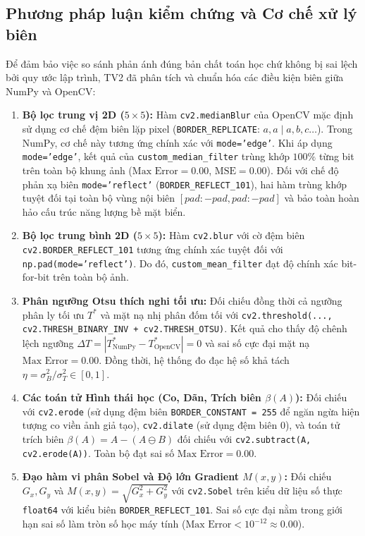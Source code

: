 \subsection{Phương pháp luận kiểm chứng và Cơ chế xử lý biên}
\label{subsec:verification_methodology}
Để đảm bảo việc so sánh phản ánh đúng bản chất toán học chứ không bị sai lệch bởi quy ước lập trình, TV2 đã phân tích và chuẩn hóa các điều kiện biên giữa NumPy và OpenCV:
\begin{enumerate}
    \item \textbf{Bộ lọc trung vị 2D ($5 \times 5$):} Hàm \texttt{cv2.medianBlur} của OpenCV mặc định sử dụng cơ chế đệm biên lặp pixel (\texttt{BORDER\_REPLICATE}: $a, a \mid a, b, c \dots$). Trong NumPy, cơ chế này tương ứng chính xác với \texttt{mode='edge'}. Khi áp dụng \texttt{mode='edge'}, kết quả của \texttt{custom\_median\_filter} trùng khớp $100\%$ từng bit trên toàn bộ khung ảnh ($\text{Max Error} = 0.00$, $\text{MSE} = 0.00$). Đối với chế độ phản xạ biên \texttt{mode='reflect'} (\texttt{BORDER\_REFLECT\_101}), hai hàm trùng khớp tuyệt đối tại toàn bộ vùng nội biên $[pad : -pad, pad : -pad]$ và bảo toàn hoàn hảo cấu trúc năng lượng bề mặt biển.
    \item \textbf{Bộ lọc trung bình 2D ($5 \times 5$):} Hàm \texttt{cv2.blur} với cờ đệm biên \texttt{cv2.BORDER\_REFLECT\_101} tương ứng chính xác tuyệt đối với \texttt{np.pad(mode='reflect')}. Do đó, \texttt{custom\_mean\_filter} đạt độ chính xác bit-for-bit trên toàn bộ ảnh.
    \item \textbf{Phân ngưỡng Otsu thích nghi tối ưu:} Đối chiếu đồng thời cả ngưỡng phân ly tối ưu $T^*$ và mặt nạ nhị phân đốm tối với \texttt{cv2.threshold(..., cv2.THRESH\_BINARY\_INV + cv2.THRESH\_OTSU)}. Kết quả cho thấy độ chênh lệch ngưỡng $\Delta T = |T^*_{\text{NumPy}} - T^*_{\text{OpenCV}}| = 0$ và sai số cực đại mặt nạ $\text{Max Error} = 0.00$. Đồng thời, hệ thống đo đạc hệ số khả tách $\eta = \sigma_B^2 / \sigma_T^2 \in [0, 1]$.
    \item \textbf{Các toán tử Hình thái học (Co, Dãn, Trích biên $\beta(A)$):} Đối chiếu với \texttt{cv2.erode} (sử dụng đệm biên \texttt{BORDER\_CONSTANT = 255} để ngăn ngừa hiện tượng co viền ảnh giả tạo), \texttt{cv2.dilate} (sử dụng đệm biên $0$), và toán tử trích biên $\beta(A) = A - (A \ominus B)$ đối chiếu với \texttt{cv2.subtract(A, cv2.erode(A))}. Toàn bộ đạt sai số $\text{Max Error} = 0.00$.
    \item \textbf{Đạo hàm vi phân Sobel và Độ lớn Gradient $M(x, y)$:} Đối chiếu $G_x, G_y$ và $M(x, y) = \sqrt{G_x^2 + G_y^2}$ với \texttt{cv2.Sobel} trên kiểu dữ liệu số thực \texttt{float64} với kiểu biên \texttt{BORDER\_REFLECT\_101}. Sai số cực đại nằm trong giới hạn sai số làm tròn số học máy tính ($\text{Max Error} < 10^{-12} \approx 0.00$).
\end{enumerate}

